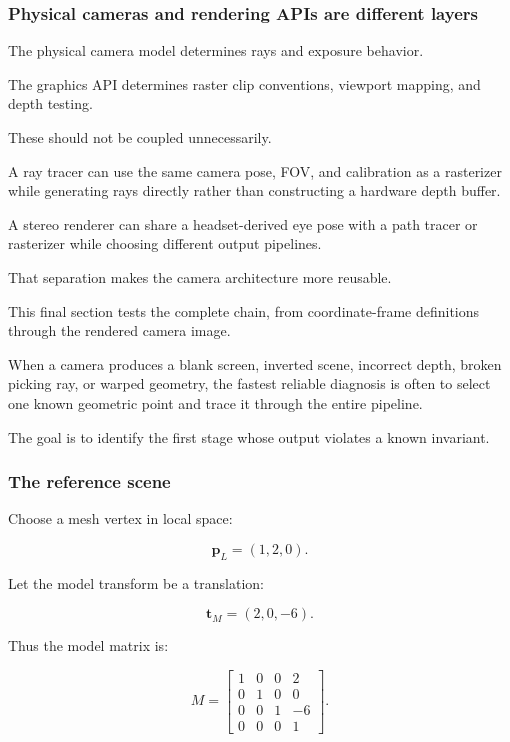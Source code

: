 \subsubsection{Physical cameras and rendering APIs are different layers}\label{physical-cameras-and-rendering-apis-are-different-layers}

The physical camera model determines rays and exposure behavior.

The graphics API determines raster clip conventions, viewport mapping, and depth testing.

These should not be coupled unnecessarily.

A ray tracer can use the same camera pose, FOV, and calibration as a rasterizer while generating rays directly rather than constructing a hardware depth buffer.

A stereo renderer can share a headset-derived eye pose with a path tracer or rasterizer while choosing different output pipelines.

That separation makes the camera architecture more reusable.

This final section tests the complete chain, from coordinate-frame definitions through the rendered camera image.

When a camera produces a blank screen, inverted scene, incorrect depth, broken picking ray, or warped geometry, the fastest reliable diagnosis is often to select one known geometric point and trace it through the entire pipeline.

The goal is to identify the first stage whose output violates a known invariant.

\subsubsection{The reference scene}\label{the-reference-scene}

Choose a mesh vertex in local space:

\[ \boxed{ \mathbf p_L=(1,2,0). } \]

Let the model transform be a translation:

\[ \boxed{ \mathbf t_M=(2,0,-6). } \]

Thus the model matrix is:

\[ M= \begin{bmatrix} 1&0&0&2\\ 0&1&0&0\\ 0&0&1&-6\\ 0&0&0&1 \end{bmatrix}. \]

